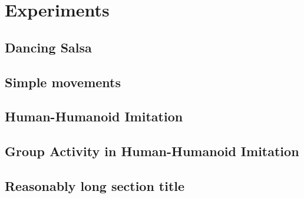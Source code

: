 
\chapter{Experiments}

\ifpdf
    \graphicspath{{Chapter4/Figs/Raster/}{Chapter4/Figs/PDF/}{Chapter4/Figs/}}
\else
    \graphicspath{{Chapter4/Figs/Vector/}{Chapter4/Figs/}}
\fi



\section{Dancing Salsa}
\section{Simple movements}
\section{Human-Humanoid Imitation}
\section{Group Activity in Human-Humanoid Imitation}



\section[Short title]{Reasonably long section title}



